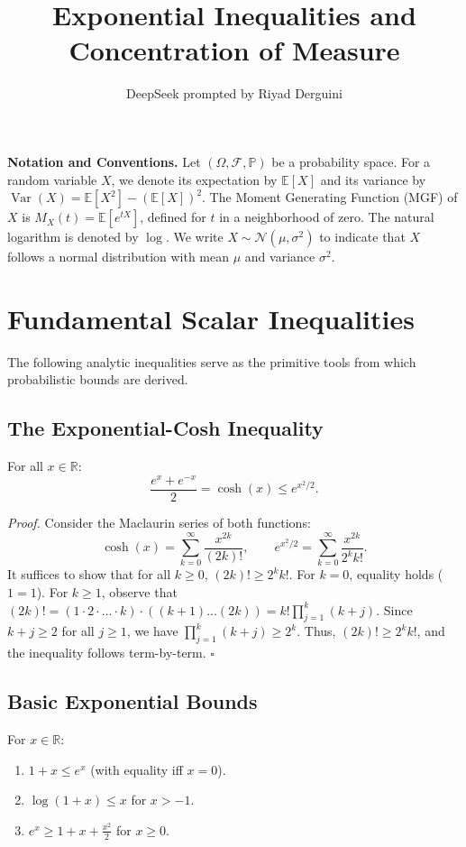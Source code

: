 \documentclass[11pt]{article}
\title{Exponential Inequalities and Concentration of Measure}
\author{DeepSeek prompted by Riyad Derguini}
\date{}
\DeclareMathOperator{\Var}{Var}
\begin{document}
\maketitle

\textbf{Notation and Conventions.} Let \((\Omega, \mathcal{F}, \mathbb{P})\) be a probability space. For a random variable \(X\), we denote its expectation by \(\mathbb{E}[X]\) and its variance by \(\Var(X) = \mathbb{E}[X^2] - (\mathbb{E}[X])^2\). The Moment Generating Function (MGF) of \(X\) is \(M_X(t) = \mathbb{E}[e^{tX}]\), defined for \(t\) in a neighborhood of zero. The natural logarithm is denoted by \(\log\). We write \(X \sim \mathcal{N}(\mu, \sigma^2)\) to indicate that \(X\) follows a normal distribution with mean \(\mu\) and variance \(\sigma^2\).

\hrulefill

\section{Fundamental Scalar Inequalities}

The following analytic inequalities serve as the primitive tools from which probabilistic bounds are derived.

\subsection{The Exponential-Cosh Inequality}
For all \(x \in \mathbb{R}\):
\[
 \frac{e^x + e^{-x}}{2} = \cosh(x) \le e^{x^2/2}. 
\]

\emph{Proof.} Consider the Maclaurin series of both functions:
\[
 \cosh(x) = \sum_{k=0}^{\infty} \frac{x^{2k}}{(2k)!}, \qquad e^{x^2/2} = \sum_{k=0}^{\infty} \frac{x^{2k}}{2^k k!}. 
\]
It suffices to show that for all \(k \ge 0\), \((2k)! \ge 2^k k!\). For \(k=0\), equality holds (\(1=1\)). For \(k \ge 1\), observe that \((2k)! = (1 \cdot 2 \cdot \dots \cdot k) \cdot ((k+1) \dots (2k)) = k! \prod_{j=1}^k (k+j)\). Since \(k+j \ge 2\) for all \(j \ge 1\), we have \(\prod_{j=1}^k (k+j) \ge 2^k\). Thus, \((2k)! \ge 2^k k!\), and the inequality follows term-by-term. \(\square\)

\subsection{Basic Exponential Bounds}
For \(x \in \mathbb{R}\):
\begin{enumerate}
    \item \(1 + x \le e^x\) (with equality iff \(x=0\)).
    \item \(\log(1+x) \le x\) for \(x > -1\).
    \item \(e^x \ge 1 + x + \frac{x^2}{2}\) for \(x \ge 0\).
\end{enumerate}
\end{document}

